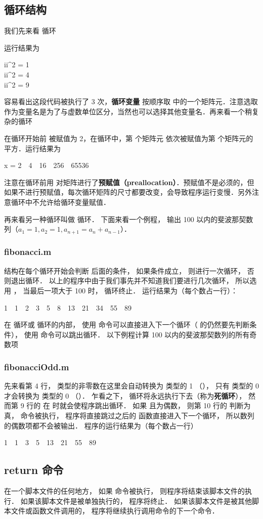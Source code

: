 \subsection{循环结构}
我们先来看  循环

运行结果为
\begin{Command}
ii\^{}2 = 1 \\
ii\^{}2 = 4 \\
ii\^{}2 = 9 
\end{Command}
容易看出这段代码被执行了 3 次，\textbf{循环变量}  按顺序取  中的一个矩阵元．注意选取  作为变量名是为了与虚数单位区分，当然也可以选择其他变量名．再来看一个稍复杂的循环

在循环开始前  被赋值为 2，在循环中，第  个矩阵元 依次被赋值为第  个矩阵元的平方．运行结果为
\begin{Command}
x = 2\ \ 4\ \ 16\ \ 256\ \ 65536
\end{Command}
注意在循环前用  对矩阵进行了\textbf{预赋值（preallocation）}．预赋值不是必须的，但如果不进行预赋值，每次循环矩阵的尺寸都要改变，会导致程序运行变慢．另外注意循环中不允许给循环变量赋值．

再来看另一种循环叫做  循环． 下面来看一个例程， 输出 100 以内的斐波那契数列（$a_1 = 1, a_2 = 1, a_{n+1} = a_{n} + a_{n-1}$）．

\subsubsection{fibonacci.m}

 结构在每个循环开始会判断  后面的条件， 如果条件成立， 则进行一次循环， 否则退出循环． 以上的程序中由于我们事先并不知道我们要进行几次循环， 所以选用 ， 当最后一项大于 100 时， 循环终止． 运行结果为（每个数占一行）：
\begin{Command}
1\ \ 1\ \ 2\ \ 3\ \ 5\ \ 8\ \ 13\ \ 21\ \ 34\ \ 55\ \ 89
\end{Command}

在  循环或  循环的内部， 使用  命令可以直接进入下一个循环（ 的仍然要先判断条件）， 使用  命令可以跳出循环． 以下例程计算 100 以内的斐波那契数列的所有奇数项

\subsubsection{fibonacciOdd.m}

先来看第 4 行，  类型的非零数在这里会自动转换为  类型的 1 （）， 只有  类型的 0 才会转换为  类型的 0 （）． 乍看之下，  循环将永远执行下去（称为\textbf{死循环}）， 然而第 9 行的  在  时就会使程序跳出循环． 如果  且为偶数， 则第 10 行的  判断为真，  命令被执行， 程序将直接跳过之后的  函数直接进入下一个循环， 所以数列的偶数项都不会被输出． 程序的运行结果为（每个数占一行）
\begin{Command}
1\ \ 1\ \ 3\ \ 5\ \ 13\ \ 21\ \ 55\ \ 89
\end{Command}

\subsection{return 命令}
在一个脚本文件的任何地方， 如果  命令被执行， 则程序将结束该脚本文件的执行． 如果该脚本文件是被单独执行的， 程序将终止． 如果该脚本文件是被其他脚本文件或函数文件调用的， 程序将继续执行调用命令的下一个命令．




